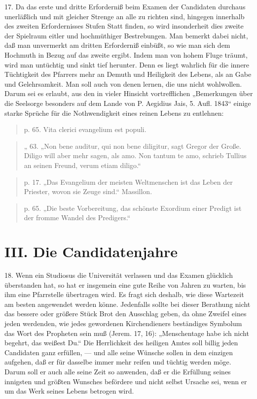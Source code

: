 17. Da das erste und dritte Erforderniß beim Examen der Candidaten durchaus unerläßlich und mit gleicher Strenge an alle zu richten sind, hingegen innerhalb des zweiten Erfordernisses Stufen Statt finden, so wird insonderheit dies zweite der Spielraum eitler und hochmüthiger Bestrebungen. Man bemerkt dabei nicht, daß man unvermerkt am dritten Erforderniß einbüßt, so wie man sich dem Hochmuth in Bezug auf das zweite ergibt. Indem man von hohem Fluge träumt, wird man untüchtig und sinkt
tief herunter. Denn es liegt wahrlich für die innere Tüchtigkeit des Pfarrers mehr an Demuth und Heiligkeit des Lebens, als an Gabe und Gelehrsamkeit. Man soll auch von denen lernen, die uns nicht wohlwollen. Darum sei es erlaubt, aus den in vieler Hinsicht vortrefflichen „Bemerkungen über die Seelsorge besonders auf dem Lande von P. Aegidius Jais, 5. Aufl. 1843“ einige starke Sprüche für die Nothwendigkeit eines reinen Lebens zu entlehnen:

\begin{quote}
p. 65. Vita clerici evangelium est populi.
\end{quote}

\begin{quote}
„ 63. „Non bene auditur, qui non bene diligitur, sagt Gregor der Große. Diligo will aber mehr sagen, als amo. Non tantum te amo, schrieb Tullius an seinen Freund, verum etiam diligo.“
\end{quote}

\begin{quote}
p. 17. „Das Evangelium der meisten Weltmenschen ist das Leben der Priester, wovon sie Zeuge sind.“ Massillon.
\end{quote}

\begin{quote}
p. 65. „Die beste Vorbereitung, das schönste Exordium einer Predigt ist der fromme Wandel des Predigers.“
\end{quote}

\section{III. Die Candidatenjahre}

18. Wenn ein Studiosus die Universität verlassen und das Examen glücklich überstanden hat, so hat er insgemein eine gute Reihe von Jahren zu warten, bis ihm eine Pfarrstelle übertragen wird. Es fragt sich deshalb, wie diese Wartezeit am besten angewendet werden könne. Jedenfalls
sollte bei dieser Berathung nicht das bessere oder größere Stück Brot den Ausschlag geben, da ohne Zweifel eines jeden werdenden, wie jedes gewordenen Kirchendieners beständiges Symbolum das Wort des Propheten sein muß (Jerem. 17, 16): „Menschentage habe ich nicht begehrt, das weißest Du.“ Die Herrlichkeit des heiligen Amtes soll billig jeden Candidaten ganz erfüllen, — und alle seine Wünsche sollen in dem einzigen aufgehen, daß er für dasselbe immer mehr reifen und tüchtig werden möge. Darum soll er auch alle seine Zeit so anwenden, daß er die Erfüllung seines innigsten und größten Wunsches befördere und nicht selbst Ursache sei, wenn er um das Werk seines Lebens betrogen wird.

